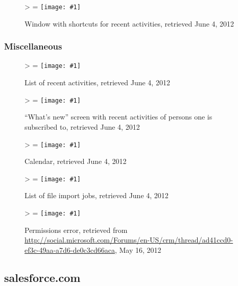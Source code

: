\documentclass[12pt,letterpaper]{article}
\newlength{\imgwidth}
\newlength{\imgheight}
\newlength{\finalwidth}
\newlength{\finalheight}
\newlength{\imgtextheight}
\newcommand\scalegraphics[1]{%
	\settowidth{\imgwidth}{\texttt{[image: \#1]}}%
	\settoheight{\imgheight}{\texttt{[image: \#1]}}%
	\ifnum\imgwidth>\imgheight \def\imgangle{90} \else \def\imgangle{0} \fi%
	\setlength{\imgtextheight}{0.74\textheight}%
	\setlength{\finalwidth}{\minof{\imgwidth}{\textwidth}}%
	\setlength{\finalheight}{\minof{\imgheight}{\imgtextheight}}%
	\ifnum\finalwidth=\imgwidth \def\imgangle{0} \fi%
	\texttt{[image: \#1]}%
}
\newcommand{\downloadDate}{May 16, 2012}
\begin{document}
\begin{figure}[htbp]
	\centering
	\scalegraphics{./img/dynamics/msft_activity_shortcuts}
	\caption[Microsoft Dynamics CRM: Window with shortcuts for recent activities]{Window with shortcuts for recent activities, retrieved June 4, 2012}
\end{figure}

\newpage
\FloatBarrier
\subsubsection{Miscellaneous}
\begin{figure}[htbp]
	\centering
	\scalegraphics{./img/dynamics/msft_activity_list}
	\caption[Microsoft Dynamics CRM: List of recent activities]{List of recent activities, retrieved June 4, 2012}
\end{figure}

\begin{figure}[htbp]
	\centering
	\scalegraphics{./img/dynamics/msft_what's_new}
	\caption[Microsoft Dynamics CRM: ``What's new'' screen with recent activities of persons one is subscribed to]{``What's new'' screen with recent activities of persons one is subscribed to, retrieved June 4, 2012}
\end{figure}

\begin{figure}[htbp]
	\centering
	\scalegraphics{./img/dynamics/msft_calendar}
	\caption[Microsoft Dynamics CRM: Calendar]{Calendar, retrieved June 4, 2012}
\end{figure}

\begin{figure}[htbp]
	\centering
	\scalegraphics{./img/dynamics/msft_imports}
	\caption[Microsoft Dynamics CRM: List of file import jobs]{List of file import jobs, retrieved June 4, 2012}
\end{figure}

\begin{figure}[htbp]
	\centering
	\scalegraphics{./img/dynamics/screen_msft_error}
	\caption[Microsoft Dynamics CRM: Permissions error]{Permissions error, retrieved from \url{http://social.microsoft.com/Forums/en-US/crm/thread/ad41ccd0-ef3c-49aa-a7d6-de0c3cd66aca}, \downloadDate}
\end{figure}

\newpage
\FloatBarrier %
\subsection{salesforce.com}
\label{appsec:salesforce}
\end{document}
